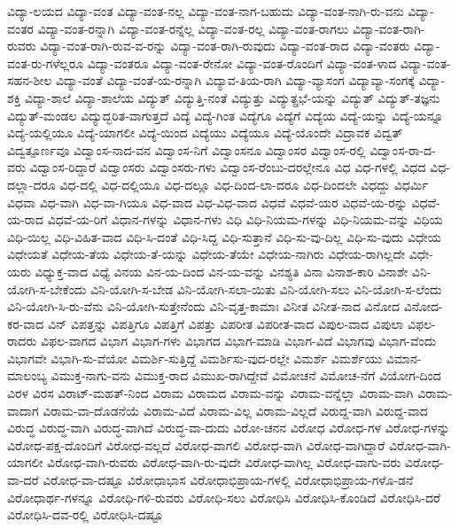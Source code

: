 {ವಿದ್ಯಾ-ಲಯದ
ವಿದ್ಯಾ-ವಂತ
ವಿದ್ಯಾ-ವಂತ-ನಲ್ಲ
ವಿದ್ಯಾ-ವಂತ-ನಾಗ-ಬಹುದು
ವಿದ್ಯಾ-ವಂತ-ನಾಗಿ-ರು-ವನು
ವಿದ್ಯಾ-ವಂತರ
ವಿದ್ಯಾ-ವಂತ-ರನ್ನಾಗಿ
ವಿದ್ಯಾ-ವಂತ-ರನ್ನೆಲ್ಲ
ವಿದ್ಯಾ-ವಂತ-ರಲ್ಲ
ವಿದ್ಯಾ-ವಂತ-ರಾಗಲು
ವಿದ್ಯಾ-ವಂತ-ರಾಗಿ-ರುವರು
ವಿದ್ಯಾ-ವಂತ-ರಾಗಿ-ರುವ-ವ-ರನ್ನು
ವಿದ್ಯಾ-ವಂತ-ರಾಗಿ-ರುವುದು
ವಿದ್ಯಾ-ವಂತ-ರಾದ
ವಿದ್ಯಾ-ವಂತರು
ವಿದ್ಯಾ-ವಂತ-ರು-ಗಳೆಲ್ಲರೂ
ವಿದ್ಯಾ-ವಂತರೂ
ವಿದ್ಯಾ-ವಂತ-ರೇನೋ
ವಿದ್ಯಾ-ವಂತ-ರೊಂದಿಗೆ
ವಿದ್ಯಾ-ವಂತ-ಳಾದ
ವಿದ್ಯಾ-ವಂತ-ಸಹನ-ಶೀಲ
ವಿದ್ಯಾ-ವಂತೆ
ವಿದ್ಯಾ-ವಂತೆ-ಯ-ರನ್ನಾಗಿ
ವಿದ್ಯಾವ-ತಿಯ-ರಾಗಿ
ವಿದ್ಯಾ-ವ್ಯಾಸಂಗ
ವಿದ್ಯಾವ್ಯಾ-ಸಂಗಕ್ಕೆ
ವಿದ್ಯಾ-ಶಕ್ತಿ
ವಿದ್ಯಾ-ಶಾಲೆ
ವಿದ್ಯಾ-ಶಾಲೆಯ
ವಿದ್ಯುತ್
ವಿದ್ಯುತ್ತಿ-ನಂತೆ
ವಿದ್ಯುತ್ತು
ವಿದ್ಯುತ್ಪ್ರಭೆ-ಯನ್ನು
ವಿದ್ಯುತ್‌
ವಿದ್ಯುತ್‌-ತಜ್ಞನು
ವಿದ್ಯುತ್‌-ಮಂಡಲ
ವಿದ್ಯುದ್ಭರಿತ-ವಾಗುತ್ತದೆ
ವಿದ್ಯೆ
ವಿದ್ಯೆ-ಗಿಂತ
ವಿದ್ಯೆಗೂ
ವಿದ್ಯೆಗೆ
ವಿದ್ಯೆಯ
ವಿದ್ಯೆ-ಯನ್ನು
ವಿದ್ಯೆ-ಯನ್ನೂ
ವಿದ್ಯೆ-ಯಲ್ಲಿಯೂ
ವಿದ್ಯೆ-ಯಾಗಲೀ
ವಿದ್ಯೆ-ಯಿಂದ
ವಿದ್ಯೆಯು
ವಿದ್ಯೆಯೂ
ವಿದ್ಯೆ-ಯೊಂದೇ
ವಿದ್ರಾವಕ
ವಿದ್ವತ್
ವಿದ್ವತ್ಪೂರ್ಣವೂ
ವಿದ್ವಾಂಸ-ನಾದ-ವನ
ವಿದ್ವಾಂಸ-ನಿಗೆ
ವಿದ್ವಾಂಸನೂ
ವಿದ್ವಾಂಸರ
ವಿದ್ವಾಂಸ-ರಲ್ಲಿ
ವಿದ್ವಾಂಸ-ರಾ-ದ-ವರು
ವಿದ್ವಾಂಸ-ರಿದ್ದಾರೆ
ವಿದ್ವಾಂಸರು
ವಿದ್ವಾಂಸರು-ಗಳು
ವಿದ್ವಾಂಸ-ರೆಂಬು-ದರಲ್ಲೇನೂ
ವಿಧ
ವಿಧ-ಗಳಲ್ಲಿ
ವಿಧದ
ವಿಧ-ದಲ್ಲಾ-ದರೂ
ವಿಧ-ದಲ್ಲಿ
ವಿಧ-ದಲ್ಲಿಯೂ
ವಿಧ-ದಲ್ಲೂ
ವಿಧ-ದಿಂದ-ಲಾ-ದರೂ
ವಿಧ-ದಿಂದಲೇ
ವಿಧದ್ದು
ವಿಧರ್ಮಿ
ವಿಧವಾ
ವಿಧ-ವಾಗಿ
ವಿಧ-ವಾ-ಗಿಯೂ
ವಿಧ-ವಾದ
ವಿಧ-ವಿಧ-ವಾದ
ವಿಧವೆ
ವಿಧವೆ-ಯರ
ವಿಧವೆ-ಯ-ರನ್ನು
ವಿಧವೆ-ಯ-ರಾದ
ವಿಧವೆ-ಯ-ರಿಗೆ
ವಿಧಾನ-ಗಳನ್ನು
ವಿಧಾನ-ಗಳು
ವಿಧಿ
ವಿಧಿ-ನಿಯಮ-ಗಳನ್ನು
ವಿಧಿ-ನಿಯಮ-ವನ್ನು
ವಿಧಿಯ
ವಿಧಿ-ಯಿಲ್ಲ
ವಿಧಿ-ವಿಹಿತ-ವಾದ
ವಿಧಿ-ಸಿ-ದಂತೆ
ವಿಧಿ-ಸಿದ್ದ
ವಿಧಿ-ಸುತ್ತಾನೆ
ವಿಧಿ-ಸು-ವು-ದಿಲ್ಲ
ವಿಧಿ-ಸು-ವುದು
ವಿಧೇಯ
ವಿಧೇಯತೆ
ವಿಧೇಯ-ತೆಯ
ವಿಧೇಯ-ತೆ-ಯನ್ನು
ವಿಧೇಯ-ತೆಯೇ
ವಿಧೇಯ-ನಾಗಿರು
ವಿಧೇಯ-ರಾಗಿಲ್ಲದೇ
ವಿಧೇ-ಯರು
ವಿಧ್ಯುಕ್ತ-ವಾದ
ವಿಧ್ಯೆ
ವಿನಯ
ವಿನ-ಯ-ದಿಂದ
ವಿನ-ಯ-ವನ್ನು
ವಿನಶ್ಯತಿ
ವಿನಾ
ವಿನಾಶ-ಕಾರಿ
ವಿನಾಶೇ
ವಿನಿ-ಯೋಗಿ-ಸ-ಬೇಕೆಂದು
ವಿನಿ-ಯೋಗಿ-ಸ-ಬೇಡ
ವಿನಿ-ಯೋಗಿ-ಸಲಾ-ಯಿತು
ವಿನಿ-ಯೋಗಿ-ಸಲು
ವಿನಿ-ಯೋಗಿ-ಸ-ಲೆಂದು
ವಿನಿ-ಯೋಗಿ-ಸಿ-ರು-ವೆನು
ವಿನಿ-ಯೋಗಿ-ಸುತ್ತೇನೆಂದು
ವಿನಿ-ವೃತ್ತ-ಕಾಮಾಃ
ವಿನೀತ
ವಿನೀತ-ನಾದ
ವಿನೋದ
ವಿನೋದ-ಕರ-ವಾದ
ವಿನ್
ವಿಪತ್ತನ್ನು
ವಿಪತ್ತಿಗೂ
ವಿಪತ್ತಿಗೆ
ವಿಪತ್ತು
ವಿಪರೀತ
ವಿಪರೀತ-ವಾದ
ವಿಪುಲ-ವಾದ
ವಿಪುಲಾ
ವಿಫಲ-ರಾದರು
ವಿಫಲ-ವಾಗದ
ವಿಭಾಗ
ವಿಭಾಗ-ಗಳು
ವಿಭಾಗದ
ವಿಭಾಗ-ಮಾಡಿ
ವಿಭಾಗ-ವಿದೆ
ವಿಭಾಗವು
ವಿಭಾಗ-ವೆಂದು
ವಿಭಾಗವೇ
ವಿಭಾಗಿ-ಸು-ವೆಯೋ
ವಿಮರ್ಶಿ-ಸುತ್ತಿದ್ದೆ
ವಿಮರ್ಶಿಸು-ವುದ-ರಲ್ಲೇ
ವಿಮರ್ಶೆ
ವಿಮರ್ಶೆಯು
ವಿಮಾನ-ಮಾಲಂಬ್ಯ
ವಿಮುಕ್ತ-ನಾಗು-ವನು
ವಿಮುಕ್ತ-ರಾದ
ವಿಮುಖ-ರಾಗಿದ್ದೇವೆ
ವಿಮೋಚನೆ
ವಿಮೋಚ-ನೆಗೆ
ವಿಯೋಗ-ದಿಂದ
ವಿರಳ
ವಿರಸ
ವಿರಾಟ್‌-ಮಹತ್‌-ನಿಂದ
ವಿರಾಮ
ವಿರಾಮದ
ವಿರಾಮ-ವನ್ನು
ವಿರಾಮ-ವನ್ನೆಲ್ಲಾ
ವಿರಾಮ-ವಾಗಿ
ವಿರಾಮ-ವಾದಾಗ
ವಿರಾಮ-ವಾ-ದೊಡನೆಯೆ
ವಿರಾಮ-ವಿದೆ
ವಿರಾಮ-ವಿಲ್ಲ
ವಿರಾಮ-ವಿಲ್ಲದೆ
ವಿರುದ್ದ-ವಾಗಿ
ವಿರುದ್ದ-ವಾದ
ವಿರುದ್ಧ
ವಿರುದ್ಧ-ವಾಗಿ
ವಿರುದ್ಧ-ವಾಗಿದೆ
ವಿರುದ್ಧ-ವಾ-ದುದು
ವಿರೋ-ಚನನ
ವಿರೋಧ
ವಿರೋಧ-ಗಳ
ವಿರೋಧ-ಗಳನ್ನು
ವಿರೋಧ-ಪಕ್ಷ-ದೊಂದಿಗೆ
ವಿರೋಧ-ವಲ್ಲದೆ
ವಿರೋಧ-ವಾಗಲಿ
ವಿರೋಧ-ವಾಗಿ
ವಿರೋಧ-ವಾಗಿದ್ದಾರೆ
ವಿರೋಧ-ವಾಗಿ-ಯಾಗಲೀ
ವಿರೋಧ-ವಾಗಿ-ರುವರು
ವಿರೋಧ-ವಾಗಿ-ರು-ವುದೇ
ವಿರೋಧ-ವಾಗಿಲ್ಲ
ವಿರೋಧ-ವಾಗು-ವರು
ವಿರೋಧ-ವಾ-ದರೆ
ವಿರೋಧ-ವಾ-ದಷ್ಟೂ
ವಿರೋಧಾಭಾಸ
ವಿರೋಧಾಭಿಪ್ರಾಯ-ಗಳಲ್ಲಿ
ವಿರೋಧಾಭಿಪ್ರಾಯ-ಗಳೊ-ಡನೆ
ವಿರೋಧಾರ್ಥ-ಗಳನ್ನೂ
ವಿರೋಧಿ-ಗಳಿ-ರುವರು
ವಿರೋಧಿ-ಸಲು
ವಿರೋಧಿಸಿ
ವಿರೋಧಿಸಿ-ಕೊಂಡಿದೆ
ವಿರೋಧಿಸಿ-ದರೆ
ವಿರೋಧಿಸಿ-ದವ-ರಲ್ಲಿ
ವಿರೋಧಿಸಿ-ದಷ್ಟೂ
}
